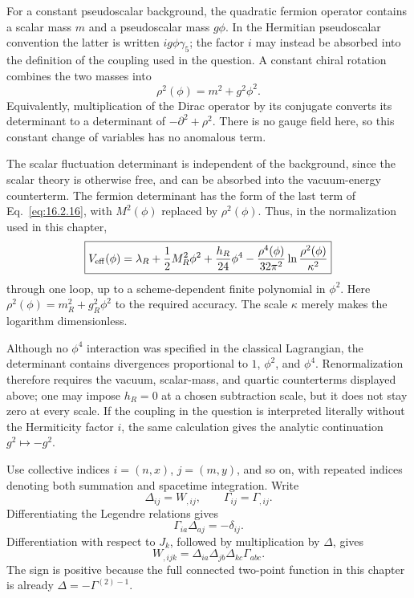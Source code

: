 \ExerciseEditorialNote

\begin{enumerate}
  For a constant pseudoscalar background, the quadratic fermion operator
  contains a scalar mass \(m\) and a pseudoscalar mass \(g\phi\).  In the
  Hermitian pseudoscalar convention the latter is written
  \(ig\phi\gamma _5\); the factor \(i\) may instead be absorbed into the
  definition of the coupling used in the question.  A constant chiral
  rotation combines the two masses into
  \[
    \rho^2(\phi)=m^2+g^2\phi^2 .
  \]
  Equivalently, multiplication of the Dirac operator by its conjugate
  converts its determinant to a determinant of
  \(-\partial^2+\rho^2\).  There is no gauge field here, so this constant
  change of variables has no anomalous term.

  The scalar fluctuation determinant is independent of the background,
  since the scalar theory is otherwise free, and can be absorbed into the
  vacuum-energy counterterm.  The fermion determinant has the form of the
  last term of Eq.~\eqref{eq:16.2.16}, with \(M^2(\phi)\) replaced by
  \(\rho^2(\phi)\).  Thus, in the normalization used in this chapter,
  \[
    \boxed{
    V_{\rm eff}(\phi)
      =\lambda_R+\frac12 M_R^2\phi^2+\frac{h_R}{24}\phi^4
       -\frac{\rho^4(\phi)}{32\pi^2}
        \ln\frac{\rho^2(\phi)}{\kappa^2}}
  \]
  through one loop, up to a scheme-dependent finite polynomial in
  \(\phi^2\).  Here
  \(\rho^2(\phi)=m_R^2+g_R^2\phi^2\) to the required accuracy.
  The scale \(\kappa\) merely makes the logarithm dimensionless.

  Although no \(\phi^4\) interaction was specified in the classical
  Lagrangian, the determinant contains divergences proportional to
  \(1\), \(\phi^2\), and \(\phi^4\).  Renormalization therefore requires
  the vacuum, scalar-mass, and quartic counterterms displayed above; one
  may impose \(h_R=0\) at a chosen subtraction scale, but it does not stay
  zero at every scale.  If the coupling in the question is interpreted
  literally without the Hermiticity factor \(i\), the same calculation
  gives the analytic continuation \(g^2\mapsto-g^2\).

  Use collective indices \(i=(n,x)\), \(j=(m,y)\), and so on, with
  repeated indices denoting both summation and spacetime integration.
  Write
  \[
    \Delta_{ij}=W_{,ij},\qquad
    \Gamma_{ij}=\Gamma_{,ij}.
  \]
  Differentiating the Legendre relations gives
  \[
    \Gamma_{ia}\Delta_{aj}=-\delta_{ij}.
  \]
  Differentiation with respect to \(J_k\), followed by multiplication by
  \(\Delta\), gives
  \[
    \boxed{W_{,ijk}
      =\Delta_{ia}\Delta_{jb}\Delta_{kc}\Gamma_{abc}.}
  \]
  The sign is positive because the full connected two-point function in
  this chapter is already
  \(\Delta=-\Gamma^{(2)-1}\).


\end{enumerate}
